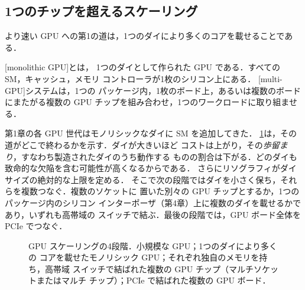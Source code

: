 \documentclass[../main.tex]{subfiles}
\begin{document}
\subsection{1つのチップを超えるスケーリング}

より速い GPU への第1の道は，1つのダイにより多くのコアを載せることである．

\begin{definition}
  [monolithic GPU]とは，
  1つのダイとして作られた GPU である．すべての SM，キャッシュ，メモリ
  コントローラが1枚のシリコン上にある．
  [multi-GPU]システムは，1つの
  パッケージ内，1枚のボード上，あるいは複数のボードにまたがる複数の
  GPU チップを組み合わせ，1つのワークロードに取り組ませる．
\end{definition}

第1章の各 GPU 世代はモノリシックなダイに SM を追加してきた．
\cref{fig:l09-scaling}は，その道がどこで終わるかを示す．ダイが大きいほど
コストは上がり，その\emph{歩留まり}，すなわち製造されたダイのうち動作する
ものの割合は下がる．どのダイも致命的な欠陥を含む可能性が高くなるからである．
さらにリソグラフィがダイサイズの絶対的な上限を定める．
そこで次の段階ではダイを小さく保ち，それらを複数つなぐ．複数のソケットに
置いた別々の GPU チップとするか，1つのパッケージ内のシリコン
インターポーザ（第4章）上に複数のダイを載せるかであり，いずれも高帯域の
スイッチで結ぶ．最後の段階では，GPU ボード全体を PCIe でつなぐ．

\begin{figure}[tb]
  \centering
  
  \caption{GPU スケーリングの4段階．小規模な GPU；1つのダイにより多くの
    コアを載せたモノリシック GPU；それぞれ独自のメモリを持ち，高帯域
    スイッチで結ばれた複数の GPU チップ（マルチソケットまたはマルチ
    チップ）；PCIe で結ばれた複数の GPU ボード．}
  \label{fig:l09-scaling}
\end{figure}
\end{document}
